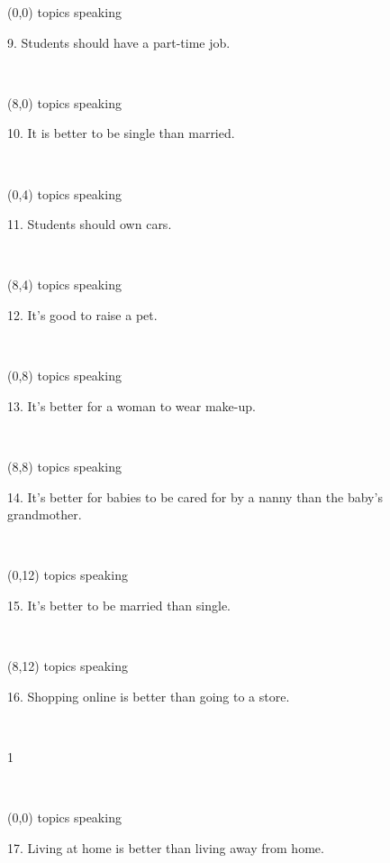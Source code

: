 \documentclass[a4paper]{article}
\newcommand{\mycard}[5]{%
	\vspace{0.1cm}
	\small #1 #2
	\par
	\parbox[t][6.7cm][c]{9.5cm}{%
	\hspace{0.1cm} \Large#3\\
	\normalsize#4 #5
	}
}
\begin{document}
\begin{textblock}{8}(0,0)
\mycard{topics}{speaking}{\parbox{9.0cm}{
9. Students should have a part-time job.
}}{}{} 
\end{textblock}

\begin{textblock}{8}(8,0)
\mycard{topics}{speaking}{\parbox{9.0cm}{
10. It is better to be single than married.
}}{}{} 
\end{textblock}

\begin{textblock}{8}(0,4)
\mycard{topics}{speaking}{\parbox{9.0cm}{
11. Students should own cars.
}}{}{} 
\end{textblock}

\begin{textblock}{8}(8,4)
\mycard{topics}{speaking}{\parbox{9.0cm}{
12. It's good to raise a pet.
}}{}{} 
\end{textblock}

\begin{textblock}{8}(0,8)
\mycard{topics}{speaking}{\parbox{9.0cm}{
13. It's better for a woman to wear make-up.
}}{}{} 
\end{textblock}

\begin{textblock}{8}(8,8)
\mycard{topics}{speaking}{\parbox{9.0cm}{
14. It's better for babies to be cared for by a nanny than the baby's grandmother.
}}{}{} 
\end{textblock}

\begin{textblock}{8}(0,12)
\mycard{topics}{speaking}{\parbox{9.0cm}{
15. It's better to be married than single.
}}{}{} 
\end{textblock}

\begin{textblock}{8}(8,12)
\mycard{topics}{speaking}{\parbox{9.0cm}{
16. Shopping online is better than going to a store.
}}{}{} 
\end{textblock}

\begin{tiny}1\end{tiny}\\
\newpage

\begin{textblock}{8}(0,0)
\mycard{topics}{speaking}{\parbox{9.0cm}{
17. Living at home is better than living away from home.
}}{}{} 
\end{textblock}
\end{document}
